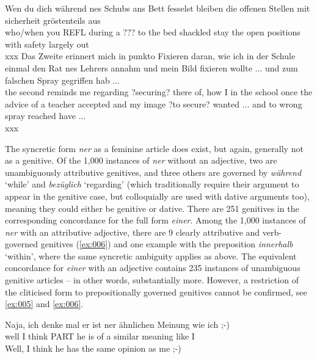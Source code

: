 \begin{exe}
\ex\label{ex:005}
	\begin{xlist}
	\ex\label{ex:0010}\gll Wen du dich während nes Schubs ans Bett fesselst bleiben die offenen Stellen mit sicherheit gröstenteils aus\\
	who/when you REFL during a ??? {to the} bed shackled stay the open positions with safety largely out\\
	\trans xxx
	\ex\label{ex:0011}\gll Das Zweite erinnert mich in punkto Fixieren daran, wie ich in der Schule einmal den Rat nes Lehrers annahm und mein Bild fixieren wollte ... und zum falschen Spray gegriffen hab ...\\
	the second reminds me regarding {} ?securing? {there of}, how I in the school once the advice {of a} teacher accepted and my image {?to secure?} wanted ... and to wrong spray reached have ...\\
	\trans xxx
	\end{xlist}
\end{exe}

The syncretic form \textit{ner} as a feminine article does exist, but again, generally not as a genitive. %
Of the 1,000 instances of \textit{ner} without an adjective, two are unambiguously attributive genitives, and three others are governed by \textit{während} `while' and \textit{bezüglich} `regarding' (which traditionally require their argument to appear in the genitive case, but colloquially are used with dative arguments too), meaning they could either be genitive or dative.
There are 251 genitives in the corresponding concordance for the full form \textit{einer}.
Among the 1,000 instances of \textit{ner} with an attributive adjective, there are 9 clearly attributive and verb-governed genitives (\ref{ex:006}) and one example with the preposition \textit{innerhalb} `within', where the same syncretic ambiguity applies as above.
The equivalent concordance for \textit{einer} with an adjective contains 235 instances of unambiguous genitive articles -- in other words, substantially more.
However, a restriction of the cliticised form to prepositionally governed genitives \citep[178]{Vogel2006} cannot be confirmed, see \ref{ex:005} and \ref{ex:006}.

\begin{exe}
\ex\label{ex:006}\gll Naja, ich denke mal er ist ner ähnlichen Meinung wie ich ;-)\\
well I think PART he is {of a} similar meaning like I\\
\trans Well, I think he has the same opinion as me ;-)
\end{exe}

